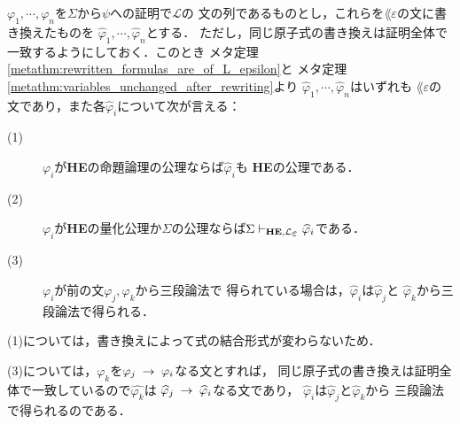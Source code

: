 	\begin{metaprf}
		$\varphi_{1},\cdots,\varphi_{n}$を$\Sigma$から$\psi$への証明で$\mathcal{L}$の
		文の列であるものとし，これらを$\lang{\varepsilon}$の文に書き換えたものを
		$\widehat{\varphi}_{1},\cdots,\widehat{\varphi}_{n}$とする．
		ただし，同じ原子式の書き換えは証明全体で一致するようにしておく．このとき
		メタ定理\ref{metathm:rewritten_formulas_are_of_L_epsilon}と
		メタ定理\ref{metathm:variables_unchanged_after_rewriting}より
		$\widehat{\varphi}_{1},\cdots,\widehat{\varphi}_{n}$はいずれも
		$\lang{\varepsilon}$の文であり，また各$\widehat{\varphi}_{i}$について次が言える：
		\begin{description}
			\item[(1)] $\varphi_{i}$が{\bf HE}の命題論理の公理ならば$\widehat{\varphi}_{i}$も
				{\bf HE}の公理である．
				
			\item[(2)] $\varphi_{i}$が{\bf HE}の量化公理か$\Sigma$の公理ならば$\Sigma 
				\provable{\mbox{{\bf HE}},\lang{\varepsilon}} \widehat{\varphi}_{i}$である．
				
			\item[(3)] $\varphi_{i}$が前の文$\varphi_{j},\varphi_{k}$から三段論法で
				得られている場合は，$\widehat{\varphi}_{i}$は$\widehat{\varphi}_{j}$と
				$\widehat{\varphi}_{k}$から三段論法で得られる．
		\end{description}
		
		(1)については，書き換えによって式の結合形式が変わらないため．
		
		(3)については，$\varphi_{k}$を$\varphi_{j} \hspace{0.25em}\rightarrow\hspace{0.25em} \varphi_{i}$なる文とすれば，
		同じ原子式の書き換えは証明全体で一致しているので$\widehat{\varphi_{k}}$は
		$\widehat{\varphi}_{j} \hspace{0.25em}\rightarrow\hspace{0.25em} \widehat{\varphi}_{i}$なる文であり，
		$\widehat{\varphi}_{i}$は$\widehat{\varphi}_{j}$と$\widehat{\varphi}_{k}$から
		三段論法で得られるのである．
		

\end{metaprf}

